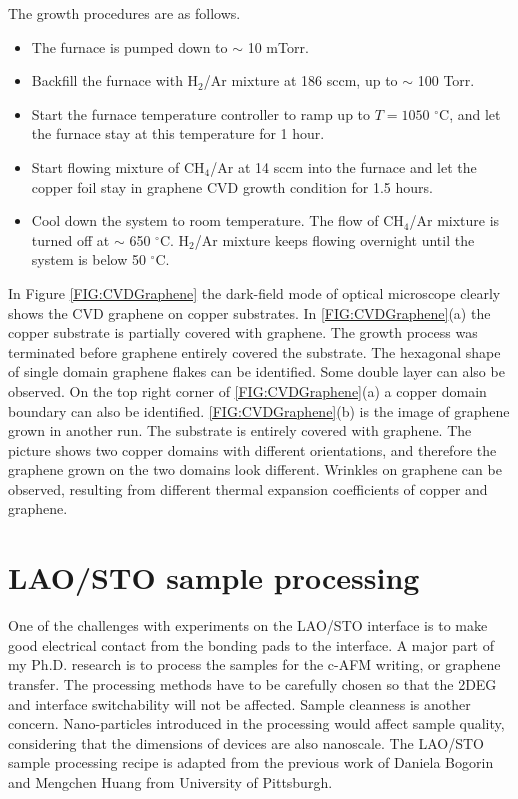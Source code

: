 \documentclass[pdflatex, sectionletters, 12pt, final, phd]{pittetd}    %
\begin{document}
The growth procedures are as follows\cite{dhingra2015quadratic}. 

\begin{itemize}
	\item The furnace is pumped down to $\sim$ 10 mTorr.
	\item Backfill the furnace with H$_2$/Ar mixture at 186 sccm, up to $\sim$ 100 Torr.
	\item Start the furnace temperature controller to ramp up to $T = 1050$ $^{\circ}$C, and let the furnace stay at this temperature for 1 hour.
	\item Start flowing mixture of CH$_4$/Ar at 14 sccm into the furnace and let the copper foil stay in graphene CVD growth condition for 1.5 hours.
	\item Cool down the system to room temperature. The flow of CH$_4$/Ar mixture is turned off at $\sim$ 650 $^{\circ}$C. H$_2$/Ar mixture keeps flowing overnight until the system is below 50 $^{\circ}$C. 
	
\end{itemize}

In Figure \ref{FIG:CVDGraphene} the dark-field mode of optical microscope clearly shows the CVD graphene on copper substrates. In \ref{FIG:CVDGraphene}(a) the copper substrate is partially covered with graphene. The growth process was terminated before graphene entirely covered the substrate. The hexagonal shape of single domain graphene flakes can be identified. Some double layer can also be observed. On the top right corner of \ref{FIG:CVDGraphene}(a) a copper domain boundary can also be identified. \ref{FIG:CVDGraphene}(b) is the image of graphene grown in another run. The substrate is entirely covered with graphene. The picture shows two copper domains with different orientations, and therefore the graphene grown on the two domains look different. Wrinkles on graphene can be observed, resulting from different thermal expansion coefficients of copper and graphene. 

\section{LAO/STO sample processing}

One of the challenges with experiments on the LAO/STO interface is to make good electrical contact from the bonding pads to the interface. A major part of my Ph.D. research is to process the samples for the c-AFM writing, or graphene transfer. The processing methods have to be carefully chosen so that the 2DEG and interface switchability will not be affected. Sample cleanness is another concern. Nano-particles introduced in the processing would affect sample quality, considering that the dimensions of devices are also nanoscale. The LAO/STO sample processing recipe is adapted from the previous work of Daniela Bogorin and Mengchen Huang from University of Pittsburgh.
\end{document}
